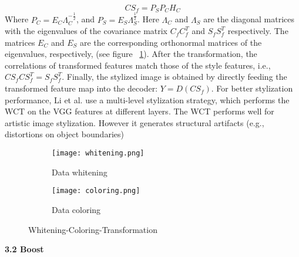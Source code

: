 \begin{equation}
CS_f = P_SP_CH_C
\end{equation}
Where $P_C=E_C\Lambda_C^{-\frac{1}{2}}$, and $P_S=E_S\Lambda_S^{\frac{1}{2}}$. Here $\Lambda_C$ and $\Lambda_S$ are the diagonal matrices with the eigenvalues of the covariance matrix $C_fC_f^T$ and $S_fS_f^T$ respectively. The matrices $E_C$ and $E_S$ are the corresponding orthonormal matrices of the eigenvalues, respectively, (see figure ~\ref{fig:WCT}). After the transformation, the correlations of
transformed features match those of the style features, i.e., $CS_fCS_f^T=S_fS_f^T$. Finally, the stylized image is obtained by directly feeding the transformed feature
map into the decoder: $Y = D(CS_f)$. For better stylization performance, Li et
al. \cite{bib11} use a multi-level stylization strategy, which performs the WCT on the
VGG features at different layers.
The WCT performs well for artistic image stylization. However it generates
structural artifacts (e.g., distortions on object boundaries)
\begin{figure}[h!]
	\centering
	\begin{subfigure}[b]{0.4\linewidth}
	\texttt{[image: whitening.png]}
		\caption{Data whitening}
		\end{subfigure}
	\begin{subfigure}[b]{0.4\linewidth}
	\texttt{[image: coloring.png]}
	\caption{Data coloring}
	\end{subfigure}
	\caption{Whitening-Coloring-Transformation}
	\label{fig:WCT}
\end{figure}
\newline
\newline\textbf{3.2  Boost}\newline